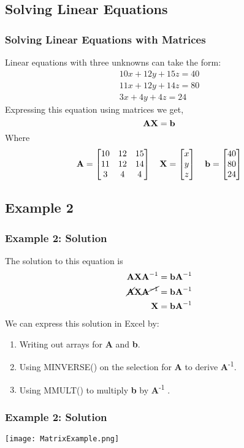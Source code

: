 \documentclass[12pt]{beamer}
\begin{document}
\subsection{Solving Linear Equations}
	\begin{frame}
		\frametitle{Solving Linear Equations with Matrices}
		Linear equations with three unknowns can take the form:
		\begin{align*}
			10x + 12y + 15z = 40 \\
			11x + 12y  + 14z = 80 \\
			3x + 4y + 4z = 24 
		\end{align*}
		Expressing this equation using matrices we get, 
		\begin{equation*}
			\textbf{\text{AX}} = \textbf{\text{b}} 
		\end{equation*}
		Where 
		\begin{equation*}
			\textbf{\text{A}} = 
			\begin{bmatrix}
				10 & 12 & 15 \\
				11 & 12 & 14 \\
				3 & 4 & 4 
			\end{bmatrix}
			\quad
			\textbf{\text{X}} = 
			\begin{bmatrix} 
				x \\
				y \\
				z
			\end{bmatrix}
			\quad
			\textbf{\text{b}} = 
			\begin{bmatrix}
				40 \\
				80 \\
				24
			\end{bmatrix}
		\end{equation*}
	\end{frame}
\subsection{Example 2}
	\begin{frame}
		\frametitle{Example 2: Solution}
		The solution to this equation is 
		\begin{align*}
			\textbf{\text{AXA}}^{-1} =  \textbf{\text{bA}}^{-1}\\
			\textbf{\text{\cancel{A}X}}\cancel{\textbf{\text{A}}^{-1}} =  \textbf{\text{bA}}^{-1}\\
			\textbf{\text{X}} = \textbf{\text{bA}}^{-1}
		\end{align*}
	We can express this solution in Excel by:
	\begin{enumerate}
		\item Writing out arrays for \textbf{A} and \textbf{b}.
		\item Using MINVERSE() on the selection for \textbf{A} to derive \textbf{A}\textsuperscript{-1}.
		\item Using MMULT() to multiply \textbf{b} by \textbf{A}\textsuperscript{-1} .
	\end{enumerate}
	\end{frame}
	\begin{frame}
		\frametitle{Example 2: Solution}
		\begin{center}
			\texttt{[image: MatrixExample.png]}
		\end{center}
	\end{frame}
\end{document}
